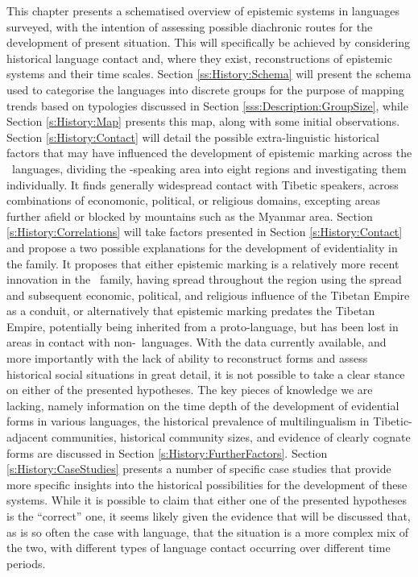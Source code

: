 This chapter presents a schematised overview of epistemic systems in languages surveyed, with the intention of assessing possible diachronic routes for the development of present situation. This will specifically be achieved by considering historical language contact and, where they exist, reconstructions of epistemic systems and their time scales. Section \ref{ss:History:Schema} will present the schema used to categorise the languages into discrete groups for the purpose of mapping trends based on typologies discussed in Section \ref{sss:Description:GroupSize}, while Section \ref{s:History:Map} presents this map, along with some initial observations. Section \ref{s:History:Contact} will detail the possible extra-linguistic historical factors that may have influenced the development of epistemic marking across the \lfam\ languages, dividing the \lfam-speaking area into eight regions and investigating them individually. It finds generally widespread contact with Tibetic speakers, across combinations of economonic, political, or religious domains, excepting areas further afield or blocked by mountains such as the Myanmar area. Section \ref{s:History:Correlations} will take factors presented in Section \ref{s:History:Contact} and propose a two possible explanations for the development of evidentiality in the family. It proposes that either epistemic marking is a relatively more recent innovation in the \lfam\ family, having spread throughout the region using the spread and subsequent economic, political, and religious influence of the Tibetan Empire as a conduit, or alternatively that epistemic marking predates the Tibetan Empire, potentially being inherited from a proto-language, but has been lost in areas in contact with non-\lfam\ languages. With the data currently available, and more importantly with the lack of ability to reconstruct forms and assess historical social situations in great detail, it is not possible to take a clear stance on either of the presented hypotheses. The key pieces of knowledge we are lacking, namely information on the time depth of the development of evidential forms in various languages, the historical prevalence of multilingualism in Tibetic-adjacent communities, historical community sizes, and evidence of clearly cognate forms are discussed in Section \ref{s:History:FurtherFactors}. Section \ref{s:History:CaseStudies} presents a number of specific case studies that provide more specific insights into the historical possibilities for the development of these systems. While it is possible to claim that either one of the presented hypotheses is the ``correct'' one, it seems likely given the evidence that will be discussed that, as is so often the case with language, that the situation is a more complex mix of the two, with different types of language contact occurring over different time periods.

